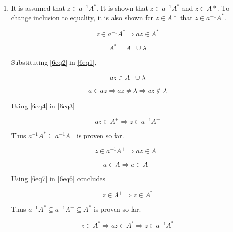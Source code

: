 \begin{enumerate}[label=(\alph*)]

\item
It is assumed that $z \in a^{-1}A^*$.
It is shown that $z \in a^{-1}A^*$ and $z \in A*$.
To change inclusion to equality, it is also shown for $z\in A*$ that $z \in a^{-1}A^*$.

\begin{equation}\label{6eq1}
z \in a^{-1}A^* \Rightarrow az \in A^*
\end{equation}

\begin{equation}\label{6eq2}
A^* = A^+ \cup \lambda
\end{equation}

Substituting \eqref{6eq2} in \eqref{6eq1},

\begin{equation}
az \in A^+ \cup \lambda \label{6eq3}
\end{equation}

\begin{equation}
a \in az \Rightarrow az \neq \lambda \Rightarrow az \notin \lambda \label{6eq4}
\end{equation}

Using \eqref{6eq4} in \eqref{6eq3}

\begin{equation}
az \in A^+ \Rightarrow z \in a^{-1}A^+
\end{equation}

Thus $a^{-1}A^*\subseteq a^{-1}A^+$ is proven so far.

\begin{equation}\label{6eq6}
z \in a^{-1}A^+ \Rightarrow az \in A^+
\end{equation}

\begin{equation}\label{6eq7}
a \in A \Rightarrow a \in A^+
\end{equation}

Using \eqref{6eq7} in \eqref{6eq6} concludes

\begin{equation}
z \in A^+ \Rightarrow z \in A^*
\end{equation}

Thus $a^{-1}A^*\subseteq a^{-1}A^+ \subseteq A^*$ is proven so far.

\begin{equation}
z \in A^* \Rightarrow az \in A^* \Rightarrow z \in a^{-1}A^*
\end{equation}


\end{enumerate}
